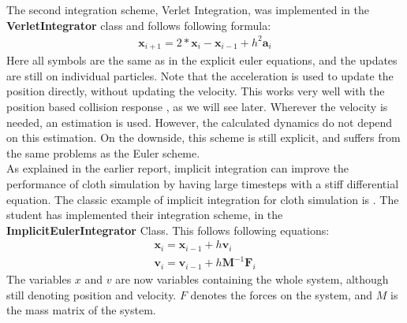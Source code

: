 The second integration scheme, Verlet Integration, was implemented in the {\bf VerletIntegrator} class and follows following formula:
\begin{equation} \label{verlet}
\begin{aligned}
\textbf{x}_{i+1} = 2 * \textbf{x}_{i} - \textbf{x}_{i-1} + h^2 \textbf{a}_{i}
\end{aligned}
\end{equation}
Here all symbols are the same as in the explicit euler equations, and the updates are still on individual particles. Note that the acceleration is used to update the position directly, without updating the velocity. This works very well with the position based collision response \cite{position_based_dyn}, as we will see later. Wherever the velocity is needed, an estimation is used. However, the calculated dynamics do not depend on this estimation. On the downside, this scheme is still explicit, and suffers from the same problems as the Euler scheme.\\

As explained in the earlier report, implicit integration can improve the performance of cloth simulation by having large timesteps with a stiff differential equation. The classic example of implicit integration for cloth simulation is \cite{baraff_implicit}. The student has implemented their integration scheme, in the {\bf ImplicitEulerIntegrator} Class. This follows following equations:
\begin{equation}\label{back_euler}
\begin{aligned}
\textbf{x}_i = \textbf{x}_{i-1} + h \textbf{v}_i \\
\textbf{v}_i = \textbf{v}_{i-1} + h \textbf{M}^{-1} \textbf{F}_i
\end{aligned}
\end{equation}
The variables $x$ and $v$ are now variables containing the whole system, although still denoting position and velocity. $F$ denotes the forces on the system, and $M$ is the mass matrix of the system.\\

